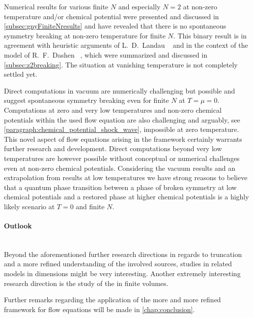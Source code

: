Numerical results for various finite $N$ and especially $N=2$ at non-zero temperature and/or chemical potential were presented and discussed in \cref{subsec:gnyFiniteNresults} and have revealed that there is no spontaneous \ZII{} symmetry breaking at non-zero temperature for finite $N$. This binary result is in agreement with heuristic arguments of L.~D.~Landau \etal{}~\cite{Landau:1980mil} and in the context of the \gn{} model of R.~F.~Dashen \etal{}~\cite{Dashen:1974xz}, which were summarized and discussed in \cref{subsec:z2breaking}. The situation at vanishing temperature is not completely settled yet. 

Direct computations in vacuum are numerically challenging but possible and suggest spontaneous \ZII{} symmetry breaking even for finite $N$ at $T=\mu=0$.
Computations at zero and very low temperatures and non-zero chemical potentials within the used \lpa{} flow equation are also challenging and arguably, see \cref{paragraph:chemical_potential_shock_wave}, impossible at zero temperature. This novel aspect of \lpa{} flow equations arising in the \cfd{} framework certainly warrants further research and development.
Direct computations beyond very low temperatures are however possible without conceptual or numerical challenges even at non-zero chemical potentials.
Considering the vacuum results and an extrapolation from results at low temperatures we have strong reasons to believe that a quantum phase transition between a phase of broken \ZII{} symmetry at low chemical potentials and a restored phase at higher chemical potentials is a highly likely scenario at $T = 0$ and finite $N$. 

\paragraph{Outlook}\label{paragraph:gnConOut}\mbox{}\\%
Beyond the aforementioned further research directions in regards to truncation and a more refined understanding of the involved sources, studies in related models in  dimensions might be very interesting. Another extremely interesting research direction is the study of the \gnyBm{} in finite volumes.
 
Further remarks regarding the application of the more and more refined \cfd{} framework for \frg{} flow equations will be made in \cref{chap:conclusion}.
